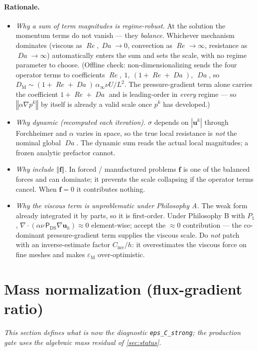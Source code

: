 \documentclass[11pt]{article}
\newcommand{\Reyn}{\operatorname{\mathit{Re}}}
\newcommand{\Damk}{\operatorname{\mathit{Da}}}
\newcommand{\DSPi}{\mathsf{P}_{\mathrm{DS}}}  %
\newcommand{\bu}{\boldsymbol{u}}
\newcommand{\bef}{\boldsymbol{f}}
\newcommand{\grad}{\nabla}
\newcommand{\divg}{\nabla\!\cdot\!}
\newcommand{\norm}[1]{\left\Vert #1\right\Vert}
\newcommand{\DM}{D_{\mathrm M}}
\newcommand{\epsM}{\varepsilon_{\mathrm M}}
\theoremstyle{plain}
\theoremstyle{remark}
\begin{document}
\paragraph{Rationale.}
\begin{itemize}
  \item \emph{Why a sum of term magnitudes is regime-robust.} At the solution the
    momentum terms do not vanish --- they \emph{balance}. Whichever mechanism
    dominates (viscous as $\Reyn,\Damk\to0$, convection as $\Reyn\to\infty$,
    resistance as $\Damk\to\infty$) automatically enters the sum and sets the
    scale, with no regime parameter to choose. (Offline check:
    non-dimensionalizing sends the four operator terms to coefficients
    $\Reyn,\ 1,\ (1+\Reyn+\Damk),\ \Damk$, so
    $\DM\sim(1+\Reyn+\Damk)\,\alpha_\infty\nu U/L^2$. The pressure-gradient term
    alone carries the coefficient $1+\Reyn+\Damk$ and is leading-order in
    \emph{every} regime --- so $\norm{\alpha\grad p^k}$ by itself is already a
    valid scale once $p^k$ has developed.)
  \item \emph{Why dynamic (recomputed each iteration).} $\sigma$ depends on
    $|\bu^k|$ through Forchheimer and $\alpha$ varies in space, so the true local
    resistance is \emph{not} the nominal global $\Damk$. The dynamic sum reads the
    actual local magnitudes; a frozen analytic prefactor cannot.
  \item \emph{Why include $\norm{\bef}$.} In forced / manufactured problems $\bef$
    is one of the balanced forces and can dominate; it prevents the scale
    collapsing if the operator terms cancel. When $\bef=0$ it contributes nothing.
  \item \emph{Why the viscous term is unproblematic under Philosophy A.} The weak
    form already integrated it by parts, so it is first-order. Under Philosophy B
    with $P_1$, $\divg(\alpha\nu\,\DSPi\grad\bu_h)\approx0$ element-wise;
    accept the $\approx0$ contribution --- the co-dominant pressure-gradient term
    supplies the viscous scale. Do \emph{not} patch with an inverse-estimate
    factor $C_{\mathrm{inv}}/h$: it overestimates the viscous force on fine meshes
    and makes $\epsM$ over-optimistic.
\end{itemize}

\section{Mass normalization (flux-gradient ratio)}\label{sec:mass}
\emph{This section defines what is now the diagnostic \texttt{eps\_C\_strong};
the production gate uses the algebraic mass residual of \cref{sec:status}.}
\end{document}
